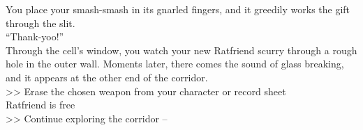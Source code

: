 You place your smash-smash in its gnarled fingers, and it greedily works the gift through the slit.\\

“Thank-yoo!”\\

Through the cell’s window, you watch your new Ratfriend scurry through a rough hole in the outer wall. Moments later, there comes the sound of glass breaking, and it appears at the other end of the corridor.\\

>> Erase the chosen weapon from your character or record sheet\\
 Ratfriend is free\\
>> Continue exploring the corridor -- 